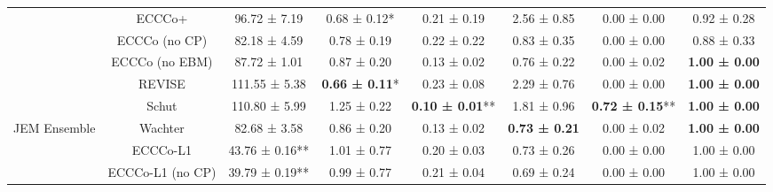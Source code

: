 \begin{table}
{\begin{tabular}[t]{cccccccc}
 & ECCCo+ & 96.72 ± 7.19\hphantom{*}\hphantom{*} & 0.68 ± 0.12*\hphantom{*} & 0.21 ± 0.19\hphantom{*}\hphantom{*} & 2.56 ± 0.85\hphantom{*}\hphantom{*} & 0.00 ± 0.00\hphantom{*}\hphantom{*} & 0.92 ± 0.28\hphantom{*}\hphantom{*}\\

 & ECCCo (no CP) & 82.18 ± 4.59\hphantom{*}\hphantom{*} & 0.78 ± 0.19\hphantom{*}\hphantom{*} & 0.22 ± 0.22\hphantom{*}\hphantom{*} & 0.83 ± 0.35\hphantom{*}\hphantom{*} & 0.00 ± 0.00\hphantom{*}\hphantom{*} & 0.88 ± 0.33\hphantom{*}\hphantom{*}\\

 & ECCCo (no EBM) & 87.72 ± 1.01\hphantom{*}\hphantom{*} & 0.87 ± 0.20\hphantom{*}\hphantom{*} & 0.13 ± 0.02\hphantom{*}\hphantom{*} & 0.76 ± 0.22\hphantom{*}\hphantom{*} & 0.00 ± 0.02\hphantom{*}\hphantom{*} & \textbf{1.00 ± 0.00}\hphantom{*}\hphantom{*}\\

 & REVISE & 111.55 ± 5.38\hphantom{*}\hphantom{*} & \textbf{0.66 ± 0.11}*\hphantom{*} & 0.23 ± 0.08\hphantom{*}\hphantom{*} & 2.29 ± 0.76\hphantom{*}\hphantom{*} & 0.00 ± 0.00\hphantom{*}\hphantom{*} & \textbf{1.00 ± 0.00}\hphantom{*}\hphantom{*}\\

 & Schut & 110.80 ± 5.99\hphantom{*}\hphantom{*} & 1.25 ± 0.22\hphantom{*}\hphantom{*} & \textbf{0.10 ± 0.01}** & 1.81 ± 0.96\hphantom{*}\hphantom{*} & \textbf{0.72 ± 0.15}** & \textbf{1.00 ± 0.00}\hphantom{*}\hphantom{*}\\

\multirow[t]{-10}{*}{\centering\arraybackslash JEM Ensemble} & Wachter & 82.68 ± 3.58\hphantom{*}\hphantom{*} & 0.86 ± 0.20\hphantom{*}\hphantom{*} & 0.13 ± 0.02\hphantom{*}\hphantom{*} & \textbf{0.73 ± 0.21}\hphantom{*}\hphantom{*} & 0.00 ± 0.02\hphantom{*}\hphantom{*} & \textbf{1.00 ± 0.00}\hphantom{*}\hphantom{*}\\
\cmidrule{1-8}
 & ECCCo-L1 & 43.76 ± 0.16** & 1.01 ± 0.77\hphantom{*}\hphantom{*} & 0.20 ± 0.03\hphantom{*}\hphantom{*} & 0.73 ± 0.26\hphantom{*}\hphantom{*} & 0.00 ± 0.00\hphantom{*}\hphantom{*} & 1.00 ± 0.00\hphantom{*}\hphantom{*}\\

 & ECCCo-L1 (no CP) & 39.79 ± 0.19** & 0.99 ± 0.77\hphantom{*}\hphantom{*} & 0.21 ± 0.04\hphantom{*}\hphantom{*} & 0.69 ± 0.24\hphantom{*}\hphantom{*} & 0.00 ± 0.00\hphantom{*}\hphantom{*} & 1.00 ± 0.00\hphantom{*}\hphantom{*}\\


\end{tabular}}
\end{table}
